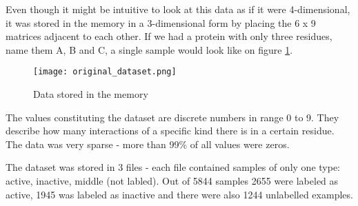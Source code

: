 \documentclass[a4paper,10pt]{report}
\begin{document}
	Even though it might be intuitive to look at this data as if it were 4-dimensional, it was stored in the memory in a 3-dimensional form by placing the 6 x 9 matrices adjacent to each other. If we had a protein with only three residues, name them A, B and C, a single sample would look like on figure \ref{fig:data_original}. 
	
	\begin{figure}[h!]
	  \centering
	  \texttt{[image: original\_dataset.png]}
	  \caption{Data stored in the memory}
	  \label{fig:data_original}
	\end{figure} 
	
	The values constituting the dataset are discrete numbers in range 0 to 9. They describe how many interactions of a specific kind there is in a certain residue. The data was very sparse - more than 99\% of all values were zeros. 
	
	The dataset was stored in 3 files - each file contained samples of only one type: active, inactive, middle (not labled). Out of 5844 samples 2655 were labeled as active, 1945 was labeled as inactive and there were also 1244 unlabelled examples. 
	

	    
           
	    
\end{document}
